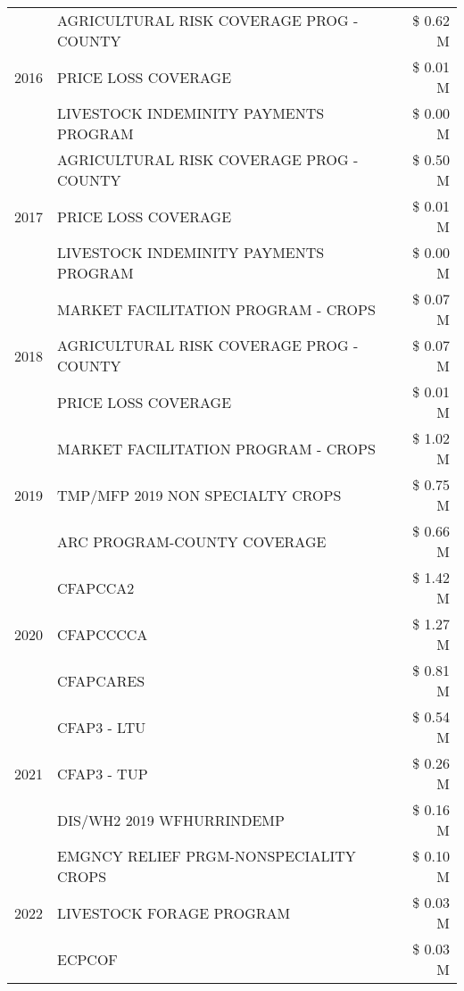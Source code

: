 \begin{tabular}{llr}
\cline{1-3}
\multirow[t]{3}{*}{2016} & AGRICULTURAL RISK COVERAGE PROG - COUNTY & \$ 0.62 M \\
 & PRICE LOSS COVERAGE & \$ 0.01 M \\
 & LIVESTOCK INDEMINITY PAYMENTS PROGRAM & \$ 0.00 M \\
\cline{1-3}
\multirow[t]{3}{*}{2017} & AGRICULTURAL RISK COVERAGE PROG - COUNTY & \$ 0.50 M \\
 & PRICE LOSS COVERAGE & \$ 0.01 M \\
 & LIVESTOCK INDEMINITY PAYMENTS PROGRAM & \$ 0.00 M \\
\cline{1-3}
\multirow[t]{3}{*}{2018} & MARKET FACILITATION PROGRAM - CROPS & \$ 0.07 M \\
 & AGRICULTURAL RISK COVERAGE PROG - COUNTY & \$ 0.07 M \\
 & PRICE LOSS COVERAGE & \$ 0.01 M \\
\cline{1-3}
\multirow[t]{3}{*}{2019} & MARKET FACILITATION PROGRAM - CROPS & \$ 1.02 M \\
 & TMP/MFP 2019 NON SPECIALTY CROPS & \$ 0.75 M \\
 & ARC PROGRAM-COUNTY COVERAGE & \$ 0.66 M \\
\cline{1-3}
\multirow[t]{3}{*}{2020} & CFAPCCA2 & \$ 1.42 M \\
 & CFAPCCCCA & \$ 1.27 M \\
 & CFAPCARES & \$ 0.81 M \\
\cline{1-3}
\multirow[t]{3}{*}{2021} & CFAP3 - LTU & \$ 0.54 M \\
 & CFAP3 - TUP & \$ 0.26 M \\
 & DIS/WH2 2019 WFHURRINDEMP & \$ 0.16 M \\
\cline{1-3}
\multirow[t]{3}{*}{2022} & EMGNCY RELIEF PRGM-NONSPECIALITY CROPS & \$ 0.10 M \\
 & LIVESTOCK FORAGE PROGRAM & \$ 0.03 M \\
 & ECPCOF & \$ 0.03 M \\
\cline{1-3}
\bottomrule
\end{tabular}
